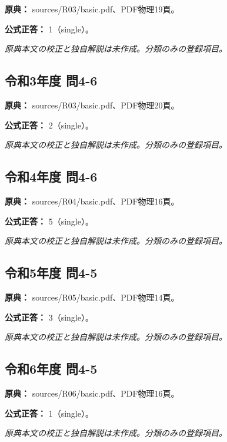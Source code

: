 \noindent\textbf{原典：} sources/R03/basic.pdf、PDF物理19頁。

\textbf{公式正答：} 1（single）。

\par\textit{原典本文の校正と独自解説は未作成。分類のみの登録項目。}

\subsection{令和3年度 問4-6}
\label{q:r03-reg-basic-4-6}

\noindent\textbf{原典：} sources/R03/basic.pdf、PDF物理20頁。

\textbf{公式正答：} 2（single）。

\par\textit{原典本文の校正と独自解説は未作成。分類のみの登録項目。}

\subsection{令和4年度 問4-6}
\label{q:r04-reg-basic-4-6}

\noindent\textbf{原典：} sources/R04/basic.pdf、PDF物理16頁。

\textbf{公式正答：} 5（single）。

\par\textit{原典本文の校正と独自解説は未作成。分類のみの登録項目。}

\subsection{令和5年度 問4-5}
\label{q:r05-reg-basic-4-5}

\noindent\textbf{原典：} sources/R05/basic.pdf、PDF物理14頁。

\textbf{公式正答：} 3（single）。

\par\textit{原典本文の校正と独自解説は未作成。分類のみの登録項目。}

\subsection{令和6年度 問4-5}
\label{q:r06-reg-basic-4-5}

\noindent\textbf{原典：} sources/R06/basic.pdf、PDF物理16頁。

\textbf{公式正答：} 1（single）。

\par\textit{原典本文の校正と独自解説は未作成。分類のみの登録項目。}

